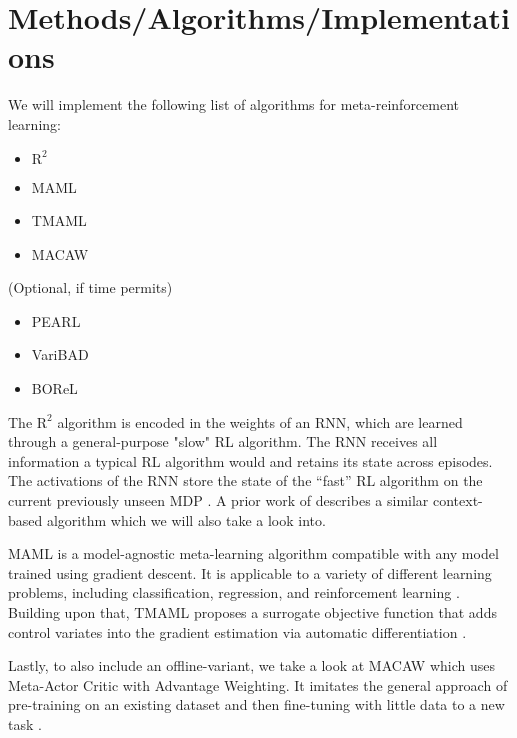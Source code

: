 \documentclass{article}
\begin{document}
\section{Methods/Algorithms/Implementations}
We will implement the following list of algorithms for meta-reinforcement learning:
\begin{multicols}{2}
\begin{itemize}
    \item $\text{R}^2$ \cite{duan_rl2_2016}
    \item MAML \cite{finn_model-agnostic_2017}
    \item TMAML \cite{liu_taming_2019}
    \item MACAW \cite{mitchell_offline_nodate}
\end{itemize}
(Optional, if time permits)

\begin{itemize}
    \item PEARL \cite{rakelly_efficient_nodate}
    \item VariBAD \cite{zintgraf_varibad_2020}
    \item BOReL \cite{dorfman_offline_2021}
\end{itemize}
\end{multicols}

The $\text{R}^2$ algorithm is encoded in the weights of an RNN, which are learned through a 
general-purpose "slow" RL algorithm. The RNN receives all information a typical RL algorithm would and retains its state across episodes. The activations of the RNN store the state of the “fast” RL algorithm on the current previously unseen MDP \cite{duan_rl2_2016}. A prior work of \citeauthor{wang_learning_2017} describes a similar context-based algorithm which we will also take a look into.

MAML is a model-agnostic meta-learning algorithm compatible with any model trained using gradient descent. It is applicable to a variety of different learning problems, including classification, regression, and reinforcement learning \cite{finn_model-agnostic_2017}. Building upon that, TMAML proposes a surrogate objective function that adds control variates into the gradient estimation via automatic differentiation \cite{liu_taming_2019}. 

Lastly, to also include an offline-variant, we take a look at MACAW which uses Meta-Actor Critic with Advantage Weighting. It imitates the general approach of pre-training on an existing dataset and then fine-tuning with little data to a new task \cite{mitchell_offline_nodate}.
\end{document}
